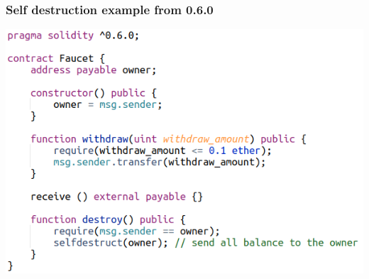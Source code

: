 \documentclass[11pt]{beamer}  %
\begin{document}
\begin{frame}\frametitle{Self destruction example from 0.6.0}

  \begin{center}
    \includegraphics[scale=0.5,clip=false]{pictures/selfdestruct_6_0.png}
  \end{center}

\end{frame}
\end{document}
